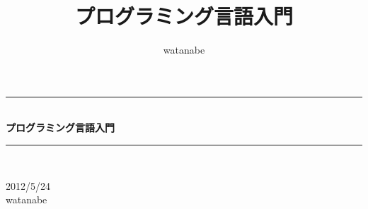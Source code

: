 \documentclass[mingoth,oneside]{jsbook}
\title{ {\Huge プログラミング言語入門}}
\author{watanabe}
\newcommand{\HRule}{\rule{\linewidth}{0.5mm}}
\begin{document}
\begin{titlepage}
\begin{center}

\vspace*{5cm}
\HRule \\[0.4cm]
{ \huge \bfseries プログラミング言語入門}\\[0.4cm]

\HRule \\[1.5cm]

\vspace*{8cm}

\begin{minipage}{0.4\textwidth}
\begin{flushright} \large
{\large 2012/5/24} \\

watanabe
\end{flushright}
\end{minipage}


\vspace*{3cm}

\end{center}
\end{titlepage}




\tableofcontents








\end{document}
